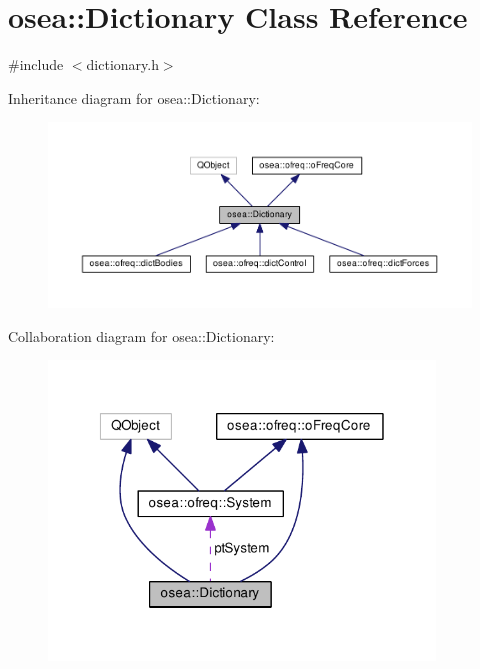\hypertarget{classosea_1_1_dictionary}{\section{osea\-:\-:Dictionary Class Reference}
\label{classosea_1_1_dictionary}
}


{\ttfamily \#include $<$dictionary.\-h$>$}



Inheritance diagram for osea\-:\-:Dictionary\-:
\nopagebreak
\begin{figure}[H]
\begin{center}
\leavevmode
\includegraphics[width=350pt]{classosea_1_1_dictionary__inherit__graph}
\end{center}
\end{figure}


Collaboration diagram for osea\-:\-:Dictionary\-:
\nopagebreak
\begin{figure}[H]
\begin{center}
\leavevmode
\includegraphics[width=291pt]{classosea_1_1_dictionary__coll__graph}
\end{center}
\end{figure}
